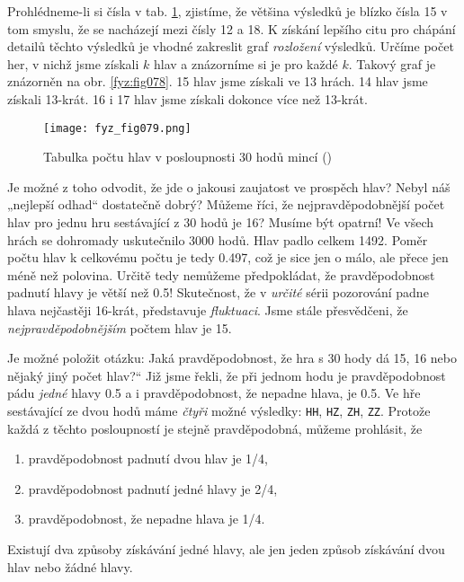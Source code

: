     Prohlédneme-li si čísla v tab. \ref{fyz:fig079}, zjistíme, že většina výsledků je blízko čísla 
    \num{15} v tom smyslu, že se nacházejí mezi čísly \num{12} a \num{18}. K získání lepšího citu 
    pro chápání detailů těchto výsledků je vhodné zakreslit graf \emph{rozložení} výsledků. Určíme 
    počet her, v nichž jsme získali \(k\) hlav a znázorníme si je pro každé \(k\). Takový graf je 
    znázorněn na obr. \ref{fyz:fig078}. \num{15} hlav jsme získali ve \num{13} hrách. \num{14} 
    hlav jsme získali \num{13}-krát. \num{16} i \num{17} hlav jsme získali dokonce více než 
    \num{13}-krát.

    \begin{figure}[ht!]  %
      \centering
      \texttt{[image: fyz\_fig079.png]}
      \caption{Tabulka počtu hlav v posloupnosti \num{30} hodů mincí (\cite[s.~80]{Feynman01})}
      \label{fyz:fig079}
    \end{figure}
    Je možné z toho odvodit, že jde o jakousi zaujatost ve prospěch hlav? Nebyl náš „nejlepší 
    odhad“ dostatečně dobrý? Můžeme říci, že nejpravděpodobnější počet hlav pro jednu hru 
    sestávající z \num{30} hodů je \num{16}? Musíme být opatrní! Ve všech hrách se dohromady 
    uskutečnilo \num{3000} hodů. Hlav padlo celkem \num{1492}. Poměr počtu hlav k celkovému počtu 
    je tedy \num{0.497}, což je sice jen o málo, ale přece jen méně než polovina. Určitě tedy 
    nemůžeme předpokládat, že pravděpodobnost padnutí hlavy je větší než \num{0.5}! Skutečnost, že 
    v \emph{určité} sérii pozorování padne hlava nejčastěji \num{16}-krát, představuje 
    \emph{fluktuaci}. Jsme stále přesvědčeni, že \emph{nejpravděpodobnějším} počtem hlav je 
    \num{15}.
    
    Je možné položit otázku: Jaká pravděpodobnost, že hra s \num{30} hody dá \num{15}, \num{16} 
    nebo nějaký jiný počet hlav?“ Již jsme řekli, že při jednom hodu je pravděpodobnost pádu 
    \emph{jedné} hlavy \num{0.5} a i pravděpodobnost, že nepadne hlava, je \num{0.5}. Ve hře 
    sestávající ze dvou hodů máme \emph{čtyři} možné výsledky: \texttt{HH}, \texttt{HZ}, 
    \texttt{ZH}, \texttt{ZZ}. Protože každá z těchto posloupností je stejně pravděpodobná, můžeme 
    prohlásit, že
    \begin{enumerate}[noitemsep]
      \item pravděpodobnost padnutí dvou hlav je \num{1/4}, 
      \item pravděpodobnost padnutí jedné hlavy je \num{2/4}, 
      \item pravděpodobnost, že nepadne hlava je \num{1/4}. 
    \end{enumerate}
    Existují dva způsoby získávání jedné hlavy, ale jen jeden způsob získávání dvou hlav nebo žádné 
    hlavy.
    
